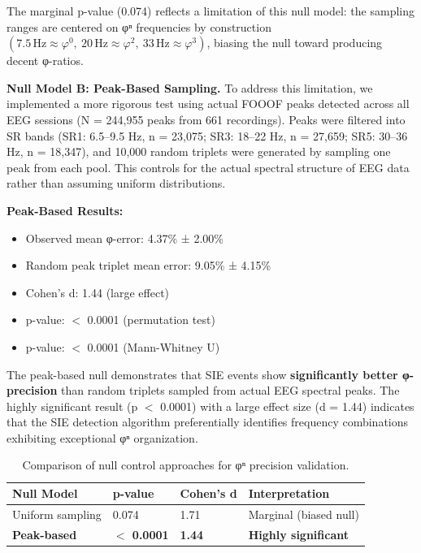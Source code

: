 \documentclass[11pt,a4paper]{article}
\begin{document}
The marginal p-value (0.074) reflects a limitation of this null model: the sampling ranges are centered on φⁿ frequencies by construction $(7.5\,\text{Hz} \approx \varphi^0,\ 20\,\text{Hz} \approx \varphi^2,\ 33\,\text{Hz} \approx \varphi^3)$, biasing the null toward producing decent φ-ratios.

\textbf{Null Model B: Peak-Based Sampling.} To address this limitation, we implemented a more rigorous test using actual FOOOF peaks detected across all EEG sessions (N = 244,955 peaks from 661 recordings). Peaks were filtered into SR bands (SR1: 6.5–9.5 Hz, n = 23,075; SR3: 18–22 Hz, n = 27,659; SR5: 30–36 Hz, n = 18,347), and 10,000 random triplets were generated by sampling one peak from each pool. This controls for the actual spectral structure of EEG data rather than assuming uniform distributions.

\textbf{Peak-Based Results:}
\begin{itemize}
\item Observed mean φ-error: 4.37\% ± 2.00\%
\item Random peak triplet mean error: 9.05\% ± 4.15\%
\item Cohen's d: 1.44 (large effect)
\item p-value: $<$ 0.0001 (permutation test)
\item p-value: $<$ 0.0001 (Mann-Whitney U)
\end{itemize}

The peak-based null demonstrates that SIE events show \textbf{significantly better φ-precision} than random triplets sampled from actual EEG spectral peaks. The highly significant result (p $<$ 0.0001) with a large effect size (d = 1.44) indicates that the SIE detection algorithm preferentially identifies frequency combinations exhibiting exceptional φⁿ organization.

\begin{table}[H]
    \centering
    \begin{tabular}{llll}
        \toprule
        Null Model & p-value & Cohen's d & Interpretation \\
        \midrule
        Uniform sampling & 0.074 & 1.71 & Marginal (biased null) \\
        \textbf{Peak-based} & \textbf{$<$ 0.0001} & \textbf{1.44} & \textbf{Highly significant} \\
        \bottomrule
    \end{tabular}
    \caption{Comparison of null control approaches for φⁿ precision validation.}
\end{table}
\end{document}
